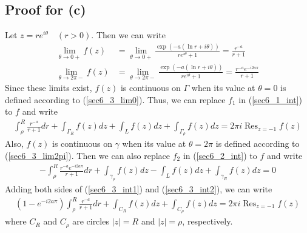 \documentclass{scrartcl}
\DeclareMathOperator*{\Res}{Res}
\begin{document}
\subsection{Proof for (c)}
Let \(z = re^{i\theta} \quad (r > 0)\).
Then we can write
\begin{align}
  \label{sec6_3_lim0} \lim_{\theta \to 0+} f(z)
  &= \lim_{\theta \to 0+} \frac{\exp(-a(\ln r + i\theta))}{re^{i\theta} + 1}
  = \frac{r^{-a}}{r + 1} \\
  \label{sec6_3_lim2pi} \lim_{\theta \to 2\pi-} f(z)
  &= \lim_{\theta \to 2\pi-} \frac{\exp(-a(\ln r + i\theta))}{re^{i\theta} + 1}
  = \frac{r^{-a} e^{-i2a\pi}}{r + 1}
\end{align}
Since these limits exist, \(f(z)\) is continuous on \(\Gamma\) when its value at \(\theta = 0\) is defined according to (\ref{sec6_3_lim0}).
Thus, we can replace \(f_1\) in (\ref{sec6_1_int}) to \(f\) and write
\begin{align}\label{sec6_3_int1}
  \int^R_\rho \frac{r^{-a}}{r + 1} dr + \int_{\Gamma_R} f(z) dz + \int_L f(z) dz + \int_{\Gamma_\rho} f(z) dz
  = 2\pi i \Res_{z = -1} f(z)
\end{align}
Also, \(f(z)\) is continuous on \(\gamma\) when its value at \(\theta = 2\pi\) is defined according to (\ref{sec6_3_lim2pi}).
Then we can also replace \(f_2\) in (\ref{sec6_2_int}) to \(f\) and write
\begin{align}\label{sec6_3_int2}
  -\int^R_\rho \frac{r^{-a} e^{-i2a\pi}}{r + 1} dr + \int_{\gamma_\rho} f(z) dz - \int_L f(z) dz + \int_{\gamma_R} f(z) dz
  = 0
\end{align}
Adding both sides of (\ref{sec6_3_int1}) and (\ref{sec6_3_int2}), we can write
\begin{align*}
  (1 - e^{-i2a\pi}) \int^R_\rho \frac{r^{-a}}{r + 1} dr + \int_{C_R} f(z) dz + \int_{C_\rho} f(z) dz
  = 2\pi i \Res_{z = -1} f(z)
\end{align*}
where \(C_R\) and \(C_\rho\) are circles \(|z| = R\) and \(|z| = \rho\), respectively.
\end{document}
